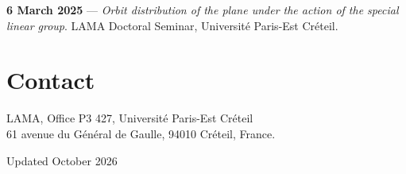 \documentclass[10pt,a4paper]{article}
\begin{document}
\textbf{6 March 2025} --- \emph{Orbit distribution of the plane under the action of the special linear group}. LAMA Doctoral Seminar, Université Paris-Est Créteil.

\section{Contact}
LAMA, Office P3 427, Université Paris-Est Créteil\\
61 avenue du Général de Gaulle, 94010 Créteil, France.

\vfill
{\small\color{muted} Updated October 2026}
\end{document}

